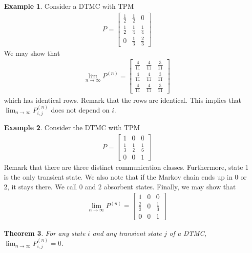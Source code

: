 \documentclass[11pt]{amsart}
\newtheorem{theorem}{Theorem}[section]
\theoremstyle{definition}
\newtheorem{example}[theorem]{Example}
\numberwithin{equation}{section}
\begin{document}
 \begin{example}
     Consider a DTMC with TPM 
     \begin{align*}
         P=\begin{bmatrix}
             \frac{1}{2} & \frac{1}{2} & 0\\
             \frac{1}{2} & \frac{1}{4} & \frac{1}{4}\\
             0 & \frac{1}{3} & \frac{2}{3}
         \end{bmatrix}
     \end{align*}
     We may show that
     \begin{align*}
         \lim_{n\to\infty} P^{(n)}=\begin{bmatrix}
             \frac{4}{11} & \frac{4}{11} & \frac{3}{11}\\
             \frac{4}{11} & \frac{4}{11} & \frac{3}{11}\\
             \frac{4}{11} & \frac{4}{11} & \frac{3}{11}
         \end{bmatrix}
     \end{align*}
     which has identical rows. Remark that the rows are identical. This implies that $\lim_{n\to\infty}P_{i,j}^{(n)}$ does not depend on $i$.
 \end{example}
 \begin{example}
     Consider the DTMC with TPM
     \begin{align*}
         P=\begin{bmatrix}
             1 & 0 & 0\\
             \frac{1}{3} & \frac{1}{2} & \frac{1}{6}\\
             0 & 0 & 1
         \end{bmatrix}
     \end{align*}
     Remark that there are three distinct communication classes. Furthermore, state 1 is the only transient state. We also note that if the Markov chain ends up in 0 or 2, it stays there. We call 0 and 2 absorbent states. Finally, we may show that
     \begin{align*}
         \lim_{n\to\infty} P^{(n)}=\begin{bmatrix}
             1 & 0 & 0\\
             \frac{2}{3} & 0 & \frac{1}{3}\\
             0 & 0 & 1
         \end{bmatrix}
     \end{align*}
 \end{example}
 \begin{theorem}
     For any state $i$ and any transient state $j$ of a DTMC, $\lim_{n\to\infty}P_{i,j}^{(n)}=0$.
 \end{theorem}
\end{document}
